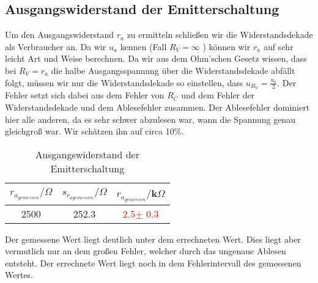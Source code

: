 \subsection{Ausgangswiderstand der Emitterschaltung}

Um den Ausgangswiderstand $r_a$ zu ermitteln schließen wir die Widerstandsdekade als Verbraucher an. Da wir $u_a$ kennen (Fall $R_V = \infty$ ) können wir 
$r_a$ auf sehr leicht Art und Weise berechnen. Da wir aus dem Ohm’schen Gesetz wissen, dass bei $R_V = r_a$ die halbe Ausgangsspannung über die Widerstandsdekade 
abfällt folgt, müssen wir nur die Widerstandsdekade so einstellen, dass $u_{R_V} = \frac{u_a}{2}$. Der Fehler setzt sich dabei aus dem Fehler von $R_C$ und dem Fehler der Widerstandsdekade
und dem Ablesefehler zusammen. Der Ablesefehler dominiert hier alle anderen, da es sehr schwer abzulesen war, wann die Spannung genau gleichgroß war. Wir schätzen ihn auf circa 10\%. 
\begin{table}[h!]
    \centering
    \begin{tabular}[h]{c|c||c}
        $r_{a_{gemessen}}/\Omega $ & $s_{r_{a{gemessen}}}/\Omega $ & $r_{a_{gemessen}}/$k$\Omega$\\
       \hline
      
        2500 & 252.3 & \textcolor{red}{2.5$\pm $ 0.3}\\
    \end{tabular}
    \caption{Ausgangswiderstand der Emitterschaltung}
\end{table}
Der gemessene Wert liegt deutlich unter dem errechneten Wert. Dies liegt aber vermutlich 
nur an dem großen Fehler, welcher durch das ungenaue Ablesen entsteht. Der errechnete Wert 
liegt noch in dem Fehlerintervall des gemessenen Wertes.